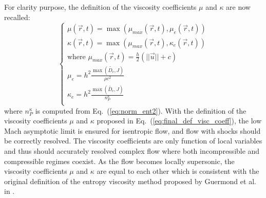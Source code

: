 \documentclass[preprint,10pt]{elsarticle}
\newcommand{\eqt}[1]{Eq.~(\ref{#1})}                     %
\newcommand{\sct}[1]{Section~\ref{#1}}                   %
\newtheorem{remark}{Remark}
\begin{document}
For clarity purpose, the definition of the viscosity coefficients $\mu$ and $\kappa$ are now recalled:
\begin{equation}
\label{eq:final_def_visc_coeff}
\left\{
\begin{array}{l}
\mu(\vec{r},t) = \max (\mu_{max}(\vec{r},t), \mu_e (\vec{r},t)) \\
\kappa(\vec{r},t) = \max (\mu_{max}(\vec{r},t), \kappa_e (\vec{r},t)) \\
\text{where } \mu_{max}(\vec{r},t) = \frac{h}{2} (||\vec{u}|| + c) \\
\mu_{e} = h^2 \frac{\max(\tilde{D_e}, J)}{\rho c^2} \\
\kappa_{e} = h^2 \frac{\max(\tilde{D_e}, J)}{n_P^{\kappa}} \\
\end{array}
\right.
\end{equation}
where $n_P^{\kappa}$ is computed from \eqt{eq:norm_ent2}. With the definition of the viscosity coefficients $\mu$ and $\kappa$ proposed in \eqt{eq:final_def_visc_coeff}, the low Mach asymptotic limit is ensured for isentropic flow, and flow with shocks should be correctly resolved. The viscosity coefficients are only function of local variables and thus should accurately resolved complex flow where both incompressible and compressible regimes coexist. As the flow becomes locally supersonic, the viscosity coefficients $\mu$ and $\kappa$ are equal to each other which is consistent with the original definition of the entropy viscosity method proposed by Guermond et al. in \cite{jlg1, jlg2}.
\end{document}
